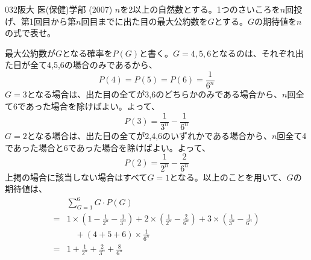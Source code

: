 \begin{thm}{032}{}{阪大 医(保健)学部 (2007)}
 $n$を2以上の自然数とする。1つのさいころを$n$回投げ、第1回目から第$n$回目までに出た目の最大公約数を$G$とする。$G$の期待値を$n$の式で表せ。
\end{thm}

最大公約数が$G$となる確率を$P(G)$と書く。$G=4,5,6$となるのは、それぞれ出た目が全て4,5,6の場合のみであるから、
\[ P(4)=P(5)=P(6)=\frac{1}{6^n} \]
$G=3$となる場合は、出た目の全てが3,6のどちらかのみである場合から、$n$回全て6であった場合を除けばよい。よって、
\[ P(3)=\frac{1}{3^n}-\frac{1}{6^n} \]
$G=2$となる場合は、出た目の全てが2,4,6のいずれかである場合から、$n$回全て4であった場合と6であった場合を除けばよい。よって、
\[ P(2)=\frac{1}{2^n}-\frac{2}{6^n} \]
上掲の場合に該当しない場合はすべて$G=1$となる。以上のことを用いて、$G$の期待値は、
\begin{align*}
 &\sum_{G=1}^6 G\cdot P(G)　\\
 =& 1\times \left(1-\frac{1}{2^n}-\frac{1}{3^n}\right)+2\times\left(\frac{1}{2^n}-\frac{2}{6^n}\right)+3\times\left(\frac{1}{3^n}-\frac{1}{6^n}\right) \\
 &\quad +(4+5+6)\times\frac{1}{6^n} \\
 =& 1+\frac{1}{2^n}+\frac{2}{3^n}+\frac{8}{6^n}
\end{align*}